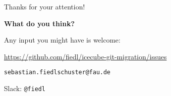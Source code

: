 
\begin{frame}{Thanks for your attention!}
  \begin{center}
    \Huge \textbf{What do you think?}
    \vspace{2em}

    \normalsize
    Any input you might have is welcome: \\ \vspace{0.3cm}

    \url{https://github.com/fiedl/icecube-git-migration/issues} \\ \vspace{0.2cm}

    \texttt{sebastian.fiedlschuster@fau.de}

    Slack: \texttt{@fiedl}

    \vspace{1.5cm}

  \end{center}
\end{frame}
